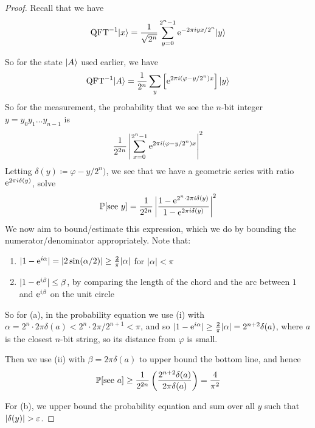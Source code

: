 \documentclass[]{article}
\renewcommand{\phi}{\varphi}
\newcommand{\qft}{\textrm{QFT}}
\begin{document}

\begin{proof}
	Recall that we have
	\begin{align*}
		\qft^{-1}\ket{x} = \frac{1}{\sqrt{2^n}} \sum_{y=0}^{2^n-1}\e^{-2\pi i yx/2^n}\ket{y}
	\end{align*}
	
	So for the state $\ket{A}$ used earlier, we have
	\begin{align*}
		\qft^{-1}\ket{A} = \frac{1}{2^n} \sum_{y}\left[ \e^{2\pi i (\phi - y/2^n)x}\right]\ket{y}
	\end{align*}
	So for the measurement, the probability that we see the $n$-bit integer $y = y_0y_1\dots y_{n-1}$ is
	\begin{align*}
		\frac{1}{2^{2n}}\left|\sum_{x=0}^{2^n-1}\e^{2\pi i (\phi - y/2^n)x}\right|^2
	\end{align*}
	Letting $\delta(y)\coloneqq \phi - y/2^n)$, we see that we have a geometric series with ratio $\e^{2\pi i\delta(y)}$, solve
	\begin{align*}
		\P[\textrm{see }y] = \frac{1}{2^{2n}}\left| \frac{1-\e^{2^n\cdot 2\pi i \delta(y)}}{1 - \e^{2\pi i \delta(y)}} \right|^2
	\end{align*}
	We now aim to bound/estimate this expression, which we do by bounding the numerator/denominator appropriately. Note that:
	\begin{enumerate}[label=(\roman*)]
		\item $|1 - \e^{i\alpha}| = |2\sin(\alpha/2)| \ge \frac{2}{\pi}|\alpha|$ for $|\alpha| < \pi$
		\item $|1 - \e^{i\beta}| \le \beta$, by comparing the length of the chord and the arc between $1$ and $\e^{i\beta}$ on the unit circle
	\end{enumerate}

	So for (a), in the probability equation we use (i) with $\alpha = 2^n\cdot 2\pi \delta(a) < 2^n\cdot 2\pi/2^{n+1} < \pi$, and so $|1 - \e^{i\alpha}| \ge \frac{2}{\pi}|\alpha| = 2^{n+2}\delta(a)$, where $a$ is the closest $n$-bit string, so its distance from $\phi$ is small.

	Then we use (ii) with $\beta = 2\pi\delta(a)$ to upper bound the bottom line, and hence
	\begin{align*}
		\P[\textrm{see }a] \ge \frac{1}{2^{2n}}\left(\frac{2^{n+2}\delta(a)}{2\pi \delta(a)}\right) = \frac{4}{\pi^2}
	\end{align*}

	For (b), we upper bound the probability equation and sum over all $y$ such that $|\delta(y)| > \eps$.


\end{proof}
\end{document}

